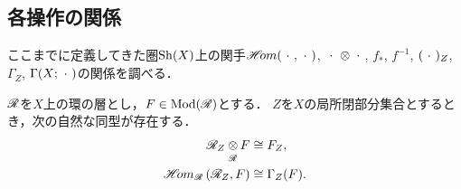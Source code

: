 \subsection*{各操作の関係}

ここまでに定義してきた圏\(\mathrm{Sh}(X)\)上の関手\(\mathop{\mathscr{H}\hspace{-2pt}om}\nolimits(\mathord{\ \cdot\ },\mathord{\ \cdot\ })\), 
\(\blk\tens\blk\), \(f_\ast\), \(f^{-1}\), \((\mathord{\ \cdot\ })_Z\), 
\(\Gamma_Z\), \(\Gamma(X;\mathord{\ \cdot\ })\)の関係を調べる．

\begin{leftbar}\begin{PRP}
    \(\mathscr{R}\)を\(X\)上の環の層とし，\(F\in\mathop{\mathrm{Mod}}\nolimits(\mathscr{R})\)とする．
    \(Z\)を\(X\)の局所閉部分集合とするとき，次の自然な同型が存在する．
    \begin{align}
        \scR_{Z}\ttens[\scR]F&\cong F_Z,\label{eq2315}\\
        \HOM_{\scR}\left(\scR_Z,F\right)&\cong\Gamma_Z(F).\label{eq2316}
    \end{align}
\end{PRP}\end{leftbar}

